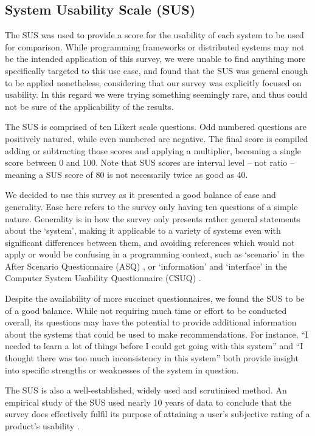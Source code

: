 \subsection{System Usability Scale (SUS)}
\label{SUS}

  The SUS \cite{BROOKE:SUS:1996} was used to provide a score for the usability of each system to be used for comparison. While programming frameworks or distributed systems may not be the intended application of this survey, we were unable to find anything more specifically targeted to this use case, and found that the SUS was general enough to be applied nonetheless, considering that our survey was explicitly focused on usability. In this regard we were trying something seemingly rare, and thus could not be sure of the applicability of the results.
  
  The SUS is comprised of ten Likert scale questions. Odd numbered questions are positively natured, while even numbered are negative. The final score is compiled adding or subtracting those scores and applying a multiplier, becoming a single score between 0 and 100. Note that SUS scores are interval level -- not ratio -- meaning a SUS score of 80 is not necessarily twice as good as 40.
  
  We decided to use this survey as it presented a good balance of ease and generality. Ease here refers to the survey only having ten questions of a simple nature. Generality is in how the survey only presents rather general statements about the `system', making it applicable to a variety of systems even with significant differences between them, and avoiding references which would not apply or would be confusing in a programming context, such as `scenario' in the After Scenario Questionnaire (ASQ) \cite{LEWIS:QUESTIONNAIRES:1995}, or `information' and `interface' in the Computer System Usability Questionnaire (CSUQ) \cite{LEWIS:QUESTIONNAIRES:1995}.
  
  Despite the availability of more succinct questionnaires, we found the SUS to be of a good balance. While not requiring much time or effort to be conducted overall, its questions may have the potential to provide additional information about the systems that could be used to make recommendations. For instance, ``I needed to learn a lot of things before I could get going with this system'' and ``I thought there was too much inconsistency in this system'' both provide insight into specific strengths or weaknesses of the system in question.
  
  The SUS is also a well-established, widely used and scrutinised method. An empirical study of the SUS used nearly 10 years of data to conclude that the survey does effectively fulfil its purpose of attaining a user's subjective rating of a product's usability \cite{BANGOR:SUS_EVALUATION:2008}.
  
